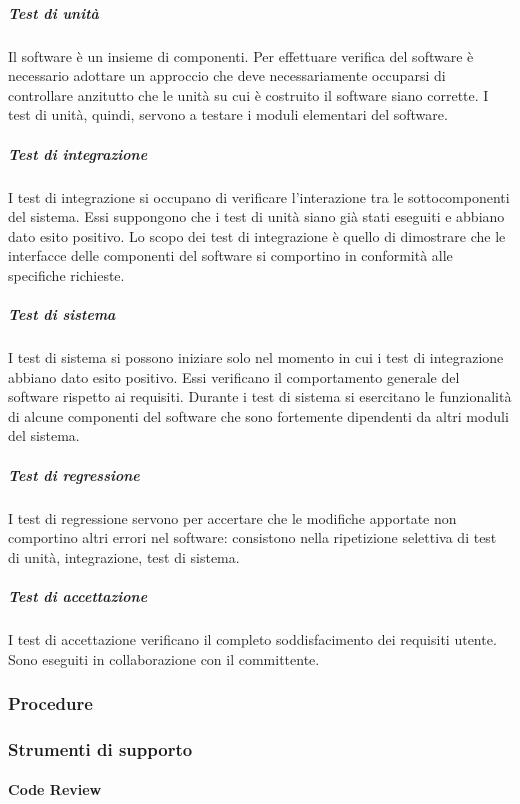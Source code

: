 \documentclass[../../norme-di-progetto.tex]{subfiles}
\begin{document}
\subparagraph{Test di unità}%
\label{subp:test_di_unita}
Il software è un insieme di componenti. Per effettuare verifica del software è necessario adottare un approccio  che deve necessariamente occuparsi di controllare anzitutto che le unità su cui è costruito il software siano corrette. I test di unità, quindi, servono a testare i moduli elementari del software.

\subparagraph{Test di integrazione}%
\label{subp:test_di_integrazione}
I test di integrazione si occupano di verificare l'interazione tra le sottocomponenti del sistema.
Essi suppongono che i test di unità siano già stati eseguiti e abbiano dato esito positivo.
Lo scopo dei test di integrazione è quello di dimostrare che le interfacce delle componenti del software si comportino in conformità alle specifiche richieste.

\subparagraph{Test di sistema}%
\label{test_di_sistema}
I test di sistema si possono iniziare solo nel momento in cui i test di integrazione abbiano dato esito positivo.
Essi verificano il comportamento generale del software rispetto ai requisiti.
Durante i test di sistema si esercitano le funzionalità di alcune componenti del software che sono fortemente dipendenti da altri moduli del sistema.

\subparagraph{Test di regressione}%
\label{test_di_regressione}
I test di regressione servono per accertare che le modifiche apportate non comportino altri errori nel software: consistono nella ripetizione selettiva di test di unità, integrazione, test di sistema.

\subparagraph{Test di accettazione}%
\label{test_di_accettazione}
I test di accettazione verificano il completo soddisfacimento dei requisiti utente.
Sono eseguiti in collaborazione con il committente.

\subsubsection{Procedure}%
\label{subs:procedure}


\subsubsection{Strumenti di supporto}%
\label{subs:verifica/strumenti}

\paragraph{Code Review}%
\label{par:code_review}
\end{document}
